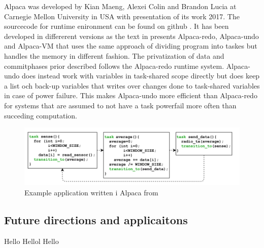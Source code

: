 \documentclass[article,a4paper]{IEEEtran}
\begin{document}
\newline\newline
Alpaca was developed by Kian Maeng, Alexei Colin and Brandon Lucia at Carnegie Mellon University in USA with presentation of its work 2017. The sourcecode for runtime enironment can be found on github \cite{Alpacasrc}. It has been developed in differerent versions as the text in \cite{Alpaca} presents Alpaca-redo, Alpaca-undo and Alpaca-VM that uses the same approach of dividing program into taskes but handles the memory in different fashion. The privatization of data and commitphases prior described follows the Alpaca-redo runtime system. Alpaca-undo does instead work with variables in task-shared scope directly but does keep a list och back-up variables that writes over changes done to task-shared variables in case of power failure. This makes Alpaca-undo more efficient than Alpaca-redo for systems that are assumed to not have a task powerfail more often than succeding computation.  
\begin{figure}
    \includegraphics[width=\columnwidth]{Alpacatasksexample.png}
    \caption{ Example application written i Alpaca from \cite{Alpaca} }
    \label{fig3_Alpaca_tasks}
\end{figure} 

\subsection{Future directions and applicaitons}
Hello Hellol Hello
\end{document}
